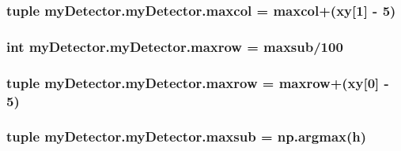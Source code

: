 \hypertarget{classmy_detector_1_1my_detector_a96cedce1e5c66aaeae9d1d8267e74e0c}{
\subsubsection[{maxcol}]{\setlength{\rightskip}{0pt plus 5cm}tuple my\-Detector.\-my\-Detector.\-maxcol = maxcol+({\bf xy}\mbox{[}1\mbox{]} -\/ 5)\hspace{0.3cm}{\ttfamily [static]}}}\label{classmy_detector_1_1my_detector_a96cedce1e5c66aaeae9d1d8267e74e0c}
\hypertarget{classmy_detector_1_1my_detector_a12a6741173b6bd3474e420c671d191e7}{
\subsubsection[{maxrow}]{\setlength{\rightskip}{0pt plus 5cm}int my\-Detector.\-my\-Detector.\-maxrow = {\bf maxsub}/100\hspace{0.3cm}{\ttfamily [static]}}}\label{classmy_detector_1_1my_detector_a12a6741173b6bd3474e420c671d191e7}
\hypertarget{classmy_detector_1_1my_detector_a6a2f55541520bde064608b1a3c5aec7a}{
\subsubsection[{maxrow}]{\setlength{\rightskip}{0pt plus 5cm}tuple my\-Detector.\-my\-Detector.\-maxrow = maxrow+({\bf xy}\mbox{[}0\mbox{]} -\/ 5)\hspace{0.3cm}{\ttfamily [static]}}}\label{classmy_detector_1_1my_detector_a6a2f55541520bde064608b1a3c5aec7a}
\hypertarget{classmy_detector_1_1my_detector_a751d25cb37c9899a46a52dab5f032ddd}{
\subsubsection[{maxsub}]{\setlength{\rightskip}{0pt plus 5cm}tuple my\-Detector.\-my\-Detector.\-maxsub = np.\-argmax({\bf h})\hspace{0.3cm}{\ttfamily [static]}}}\label{classmy_detector_1_1my_detector_a751d25cb37c9899a46a52dab5f032ddd}
